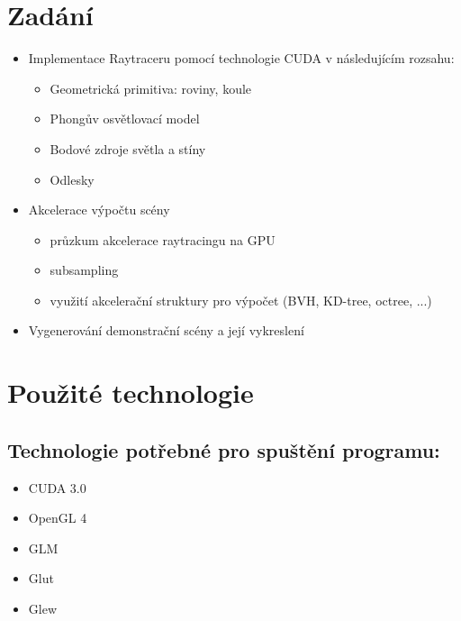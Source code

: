 \documentclass[12pt,a4paper,titlepage,final]{report}
\begin{document}
	\def\authora{Jan Bureš}
	\def\authorb{Pavel Macenauer}
	\def\emaila{xbures19@stud.fit.vutbr.cz}
	\def\emailb{xmacen02@stud.fit.vutbr.cz}
	\def\docname{Počítačová grafika}
	\def\projname{Raytracing na CUDA}
	
	\newpage
	\pagestyle{plain}
	\setcounter{page}{1}
	\setcounter{secnumdepth}{-1}
	\setlength{\parindent}{1cm}	

\section{Zadání}

\begin{itemize}
	\item Implementace Raytraceru pomocí technologie CUDA v následujícím rozsahu:
	\begin{itemize}
		\item Geometrická primitiva: roviny, koule
		\item Phongův osvětlovací model
		\item Bodové zdroje světla a stíny
		\item Odlesky
	\end{itemize}
	\item Akcelerace výpočtu scény
	\begin{itemize}
		\item průzkum akcelerace raytracingu na GPU
		\item subsampling
		\item využití akcelerační struktury pro výpočet (BVH, KD-tree, octree, ...)
	\end{itemize}
	\item Vygenerování demonstrační scény a její vykreslení
\end{itemize}

\section{Použité technologie}

\subsection{Technologie potřebné pro spuštění programu:}
\begin{itemize}
	\item CUDA 3.0
	\item OpenGL 4
	\item GLM
	\item Glut
	\item Glew
\end{itemize}
\end{document}
